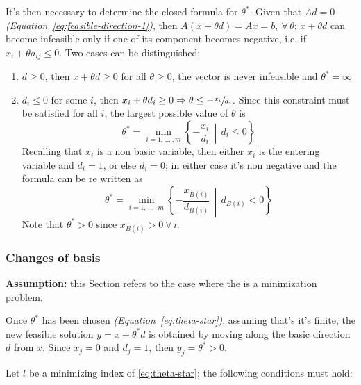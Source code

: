 \documentclass[english]{article}
\begin{document}
\bigskip
It's then necessary to determine the closed formula for \(\theta^\ast\).
Given that \(A d = 0\) \textit{(Equation~\ref{eq:feasible-direction-1})}, then \(A \left( x + \theta d \right) = Ax = b, \ \forall \, \theta\);
\(x + \theta d\) can become infeasible only if one of its component becomes negative, i.e. if \(x_i + \theta a_{ij} \leq 0\).
Two cases can be distinguished:

\begin{enumerate}
  \item \(d \geq 0\), then \(x + \theta d \geq 0\) for all \(\theta \geq 0\), the vector is never infeasible and \(\theta^\ast = \infty\)
  \item \(d_i \leq 0\) for some \(i\), then \(x_i + \theta d_i \geq 0 \Rightarrow \theta \leq -\sfrac{x_i}{d_i}\).
        Since this constraint must be satisfied for all \(i\), the largest possible value of \(\theta\) is
        \begin{equation}
          \theta^\ast = \min_{i=1, \, \ldots \,, m} \left\{ -\dfrac{x_i}{d_i} \,\middle\vert\, d_i \leq 0 \right\}
        \end{equation}
        Recalling that \(x_i\) is a non basic variable, then either \(x_i\) is the entering variable and \(d_i = 1\), or else \(d_i = 0\);
        in either case it's non negative and the formula can be re written as
        \begin{equation}
          \theta^\ast = \min_{i=1, \, \ldots \,, m} \left\{ - \dfrac{x_{B(i)}}{d_{B(i)}} \,\middle\vert\, d_{B(i)} < 0 \right\}
          \label{eq:theta-star}
        \end{equation}
        Note that \(\theta^\ast > 0\) since \(x_{B(i)} > 0 \ \forall \, i\).
\end{enumerate}

\subsubsection{Changes of basis}

\textbf{Assumption:} this Section refers to the case where the \LP is a minimization problem.

\bigskip
Once \(\theta^\ast\) has been chosen \textit{(Equation~\ref{eq:theta-star})}, assuming that's it's finite, the new feasible solution \(y= x + \theta^\ast d\) is obtained by moving along the basic direction \(d\) from \(x\).
Since \(x_j=0\) and \(d_j=1\), then \(y_j = \theta^\ast > 0\).

Let \(l\) be a minimizing index of \ref{eq:theta-star};
the following conditions must hold:
\end{document}

